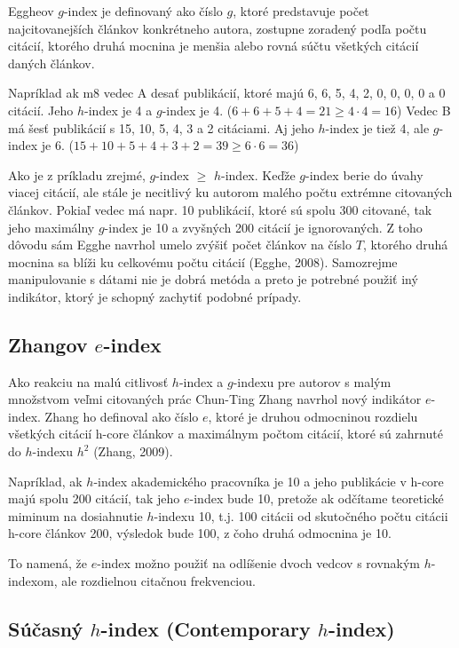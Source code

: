 Eggheov $g$-index je definovaný ako číslo $g$, ktoré predstavuje počet
najcitovanejších článkov konkrétneho autora, zostupne zoradený podľa počtu
citácií, ktorého druhá mocnina je menšia alebo rovná súčtu všetkých citácií
daných článkov.

Napríklad ak m8 vedec A desať publikácií, ktoré majú 6, 6, 5, 4, 2, 0, 0, 0, 0 a
0 citácií. Jeho $h$-index je 4 a $g$-index je 4.
($6+6+5+4 = 21 \geq 4\cdot4=16$) Vedec B má šesť publikácií s 15, 10, 5, 4, 3 a
2 citáciami. Aj jeho $h$-index je tiež 4, ale $g$-index je 6.
($15+10+5+4+3+2 = 39 \geq 6\cdot6 = 36$)

Ako je z príkladu zrejmé, $g$-index $\geq$ $h$-index. Keďže $g$-index berie do
úvahy viacej citácií, ale stále je necitlivý ku autorom malého počtu extrémne
citovaných článkov. Pokiaľ vedec má napr. 10 publikácií, ktoré sú spolu 300
citované, tak jeho maximálny $g$-index je 10 a zvyšných 200 citácií je
ignorovaných. Z toho dôvodu sám Egghe navrhol umelo zvýšiť počet článkov na
číslo $T$, ktorého druhá mocnina sa blíži ku celkovému počtu citácií (Egghe,
2008). Samozrejme manipulovanie s dátami nie je dobrá metóda a preto je potrebné
použiť iný indikátor, ktorý je schopný zachytiť podobné prípady.


\subsection{Zhangov $e$-index}

Ako reakciu na malú citlivosť $h$-index a $g$-indexu pre autorov s malým
množstvom veľmi citovaných prác Chun-Ting Zhang navrhol nový indikátor
$e$-index. Zhang ho definoval ako číslo $e$, ktoré je druhou odmocninou rozdielu
všetkých citácií h-core článkov a maximálnym počtom citácií, ktoré sú zahrnuté
do $h$-indexu $h^2$ (Zhang, 2009).

Napríklad, ak $h$-index akademického pracovníka je 10 a jeho publikácie v h-core
majú spolu 200 citácií, tak jeho $e$-index bude 10, pretože ak odčítame
teoretické miminum na dosiahnutie $h$-indexu 10, t.j. 100 citácii od skutočného
počtu citácii h-core článkov 200, výsledok bude 100, z čoho druhá odmocnina je
10.

To namená, že $e$-index možno použiť na odlíšenie dvoch vedcov s rovnakým
$h$-indexom, ale rozdielnou citačnou frekvenciou.


\subsection{Súčasný $h$-index (Contemporary $h$-index)}

